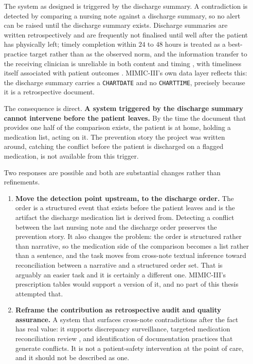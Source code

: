 The system as designed is triggered by the discharge summary. A contradiction is
detected by comparing a nursing note against a discharge summary, so no alert
can be raised until the discharge summary exists. Discharge summaries are
written retrospectively and are frequently not finalised until well after the
patient has physically left; timely completion within $24$ to $48$ hours is
treated as a best-practice target rather than as the observed norm, and the
information transfer to the receiving clinician is unreliable in both content
and timing \citep{kripalani2007deficits}, with timeliness itself associated with
patient outcomes \citep{li2013timeliness}. MIMIC-III's own data layer reflects
this: the discharge summary carries a \texttt{CHARTDATE} and no
\texttt{CHARTTIME}, precisely because it is a retrospective document.

The consequence is direct. \textbf{A system triggered by the discharge summary
cannot intervene before the patient leaves.} By the time the document that
provides one half of the comparison exists, the patient is at home, holding a
medication list, acting on it. The prevention story the project was written
around, catching the conflict before the patient is discharged on a flagged
medication, is not available from this trigger.

Two responses are possible and both are substantial changes rather than
refinements.

\begin{enumerate}
\item \textbf{Move the detection point upstream, to the discharge order.} The
      order is a structured event that exists before the patient leaves and is
      the artifact the discharge medication list is derived from. Detecting a
      conflict between the last nursing note and the discharge order preserves
      the prevention story. It also changes the problem: the order is structured
      rather than narrative, so the medication side of the comparison becomes a
      list rather than a sentence, and the task moves from cross-note textual
      inference toward reconciliation between a narrative and a structured
      order set. That is arguably an easier task and it is certainly a different
      one. MIMIC-III's prescription tables would support a version of it, and no
      part of this thesis attempted that.
\item \textbf{Reframe the contribution as retrospective audit and quality
      assurance.} A system that surfaces cross-note contradictions after the
      fact has real value: it supports discrepancy surveillance, targeted
      medication reconciliation review \citep{wong2008reconciliation}, and
      identification of documentation practices that generate conflicts. It is
      not a patient-safety intervention at the point of care, and it should not
      be described as one.
\end{enumerate}

